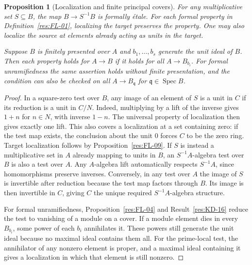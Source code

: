 \documentclass[11pt,oneside,openany]{book}
\newtheorem{proposition}[theorem]{Proposition}
\theoremstyle{definition}
\theoremstyle{remark}
\begin{document}
\begin{proposition}[Localization and finite principal covers]\label{res:FL-10}
For any multiplicative set $S\subseteq B$, the map $B\to S^{-1}B$ is
formally \'{e}tale. For each formal property in Definition~\ref{res:FL-01},
localizing the target preserves the property. One may also localize the
source at elements already acting as units in the target.

Suppose $B$ is finitely presented over $A$ and $b_1,\ldots,b_s$ generate the
unit ideal of $B$. Then each property holds for $A\to B$ if it holds for all
$A\to B_{b_i}$. For formal unramifiedness the same assertion holds without
finite presentation, and the condition can also be checked on all
$A\to B_{\mathfrak q}$ for $\mathfrak q\in\operatorname{Spec}B$.
\end{proposition}
\begin{proof}
In a square-zero test over $B$, any image of an element of $S$ is a unit
in $C$ if its reduction is a unit in $C/N$. Indeed, multiplying by a
lift of the inverse gives $1+n$ for $n\in N$, with inverse $1-n$.
The universal property of localization then gives exactly one lift.
This also covers a localization at a set containing zero: if the test map
exists, the conclusion about the unit $0$ forces $C$ to be the zero ring.
Target localization follows by Proposition~\ref{res:FL-09}. If $S$
is instead a multiplicative set in $A$ already mapping to units in $B$,
an $S^{-1}A$-algebra test over $B$ is also a test over $A$. Any $A$-algebra
lift automatically respects $S^{-1}A$, since homomorphisms preserve inverses.
Conversely, in any test over $A$ the image of $S$ is invertible after
reduction because the test map factors through $B$. Its image is then
invertible in $C$, giving $C$ the unique required $S^{-1}A$-algebra structure.

For formal unramifiedness, Proposition~\ref{res:FL-04} and
Result~\ref{res:KD-16} reduce the test to vanishing of a module on a cover.
If a module element dies in every $B_{b_i}$, some power of each $b_i$
annihilates it. These powers still generate the unit ideal because no maximal
ideal contains them all. For the prime-local test, the annihilator of any
nonzero element is proper, and a maximal ideal containing it gives a
localization in which that element is still nonzero.


\end{proof}
\end{document}
